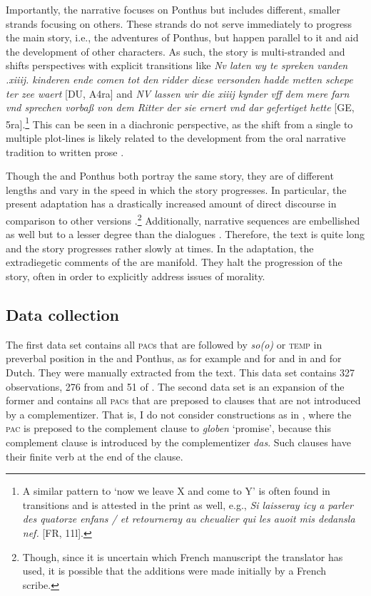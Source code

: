 \documentclass[output=paper,colorlinks,citecolor=brown]{langscibook}
\begin{document}
Importantly, the narrative focuses on Ponthus but includes different, smaller strands focusing on others. These strands do not serve immediately to progress the main story, i.e., the adventures of Ponthus, but happen parallel to it and aid the development of other characters. As such, the story is multi-stranded and shifts perspectives with explicit transitions like \textit{Nv laten wy te spreken vanden .xiiij. kinderen ende comen tot den ridder diese versonden hadde metten schepe ter zee waert} [DU, A4ra] and \textit{NV lassen wir die xiiij kynder vff dem mere farn vnd sprechen vorbaß von dem Ritter der sie ernert vnd dar gefertiget hette} [GE, 5ra].\footnote{A similar pattern to `now we leave X and come to Y' is often found in transitions and is attested in the  print as well, e.g., \textit{Si laisseray icy a parler des quatorze enfans / et retourneray au cheualier qui les auoit mis dedansla nef.} [FR, 11l].} This can be seen in a diachronic perspective, as the shift from a single to multiple plot-lines is likely related to the development from the oral narrative tradition to written prose \citep{Fludernik2003, Zeman2023a}.

Though the  and  Ponthus both portray the same story, they are of different lengths and vary in the speed in which the story progresses. In particular, the present  adaptation has a drastically increased amount of direct discourse in comparison to other versions \citep[959]{Phinney1962}.\footnote{Though, since it is uncertain which French manuscript the translator has used, it is possible that the additions were made initially by a French scribe.} Additionally, narrative sequences are embellished as well but to a lesser degree than the dialogues \citep[19--26]{Schneider1961}. Therefore, the text is quite long and the story progresses rather slowly at times.
In the  adaptation, the extradiegetic comments of the  are manifold. They halt the progression of the story, often in order to explicitly address issues of morality. 


\subsection{Data collection}\label{sec:3.2}
The first data set contains all \textsc{pac}s that are followed by \textit{so(o)} or \textsc{temp} in preverbal position in the  and  Ponthus, as for example  and  for  and in  and  for Dutch. They were manually extracted from the text. This data set contains 327 observations, 276 from  and 51 of . The second data set is an expansion of the former and contains all \textsc{pac}s that are preposed to clauses that are not introduced by a complementizer. That is, I do not consider constructions as in , where the \textsc{pac} is preposed to the complement clause to \textit{globen} `promise', because this complement clause is introduced by the complementizer \textit{das}. Such clauses have their finite verb at the end of the clause.
 
\end{document}
